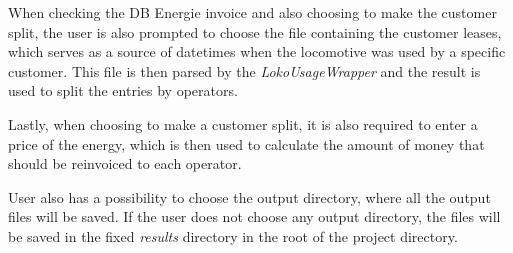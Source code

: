\documentclass[11pt]{article}
\begin{document}
When checking the DB Energie invoice and also choosing to make the customer split, the user is also prompted to choose the file containing the customer leases, which serves as a source of datetimes when the locomotive was used by a specific customer. This file is then parsed by the \textit{LokoUsageWrapper} and the result is used to split the entries by operators.

Lastly, when choosing to make a customer split, it is also required to enter a price of the energy, which is then used to calculate the amount of money that should be reinvoiced to each operator.

User also has a possibility to choose the output directory, where all the output files will be saved. If the user does not choose any output directory, the files will be saved in the fixed \textit{results} directory in the root of the project directory.
\end{document}
